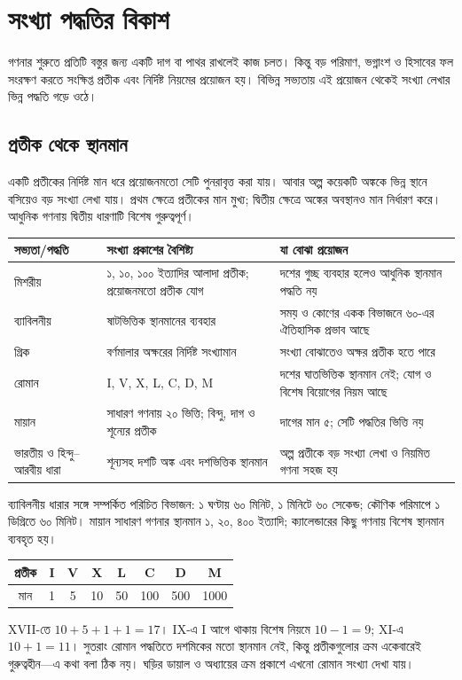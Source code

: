 \section{সংখ্যা পদ্ধতির বিকাশ}
গণনার শুরুতে প্রতিটি বস্তুর জন্য একটি দাগ বা পাথর রাখলেই কাজ চলত। কিন্তু বড় পরিমাণ, ভগ্নাংশ ও হিসাবের ফল সংরক্ষণ করতে সংক্ষিপ্ত প্রতীক এবং নির্দিষ্ট নিয়মের প্রয়োজন হয়। বিভিন্ন সভ্যতায় এই প্রয়োজন থেকেই সংখ্যা লেখার ভিন্ন পদ্ধতি গড়ে ওঠে।

\subsection{প্রতীক থেকে স্থানমান}
একটি প্রতীকের নির্দিষ্ট মান ধরে প্রয়োজনমতো সেটি পুনরাবৃত্ত করা যায়। আবার অল্প কয়েকটি অঙ্ককে ভিন্ন স্থানে বসিয়েও বড় সংখ্যা লেখা যায়। প্রথম ক্ষেত্রে প্রতীকের মান মুখ্য; দ্বিতীয় ক্ষেত্রে অঙ্কের অবস্থানও মান নির্ধারণ করে। আধুনিক গণনায় দ্বিতীয় ধারণাটি বিশেষ গুরুত্বপূর্ণ।
\begin{center}\begin{tabularx}{\linewidth}{|L{.18\linewidth}|Y|Y|}\hline
{}সভ্যতা/পদ্ধতি&সংখ্যা প্রকাশের বৈশিষ্ট্য&যা বোঝা প্রয়োজন\\\hline
মিশরীয়&১, ১০, ১০০ ইত্যাদির আলাদা প্রতীক; প্রয়োজনমতো প্রতীক যোগ&দশের গুচ্ছ ব্যবহার হলেও আধুনিক স্থানমান পদ্ধতি নয়\\\hline
ব্যাবিলনীয়&ষাটভিত্তিক স্থানমানের ব্যবহার&সময় ও কোণের একক বিভাজনে ৬০-এর ঐতিহাসিক প্রভাব আছে\\\hline
গ্রিক&বর্ণমালার অক্ষরের নির্দিষ্ট সংখ্যামান&সংখ্যা বোঝাতেও অক্ষর প্রতীক হতে পারে\\\hline
রোমান&I, V, X, L, C, D, M&দশের ঘাতভিত্তিক স্থানমান নেই; যোগ ও বিশেষ বিয়োগের নিয়ম আছে\\\hline
মায়ান&সাধারণ গণনায় ২০ ভিত্তি; বিন্দু, দাগ ও শূন্যের প্রতীক&দাগের মান ৫; সেটি পদ্ধতির ভিত্তি নয়\\\hline
ভারতীয় ও হিন্দু–আরবীয় ধারা&শূন্যসহ দশটি অঙ্ক এবং দশভিত্তিক স্থানমান&অল্প প্রতীকে বড় সংখ্যা লেখা ও নিয়মিত গণনা সহজ হয়\\\hline
\end{tabularx}\end{center}
ব্যাবিলনীয় ধারার সঙ্গে সম্পর্কিত পরিচিত বিভাজন: ১ ঘণ্টায় ৬০ মিনিট, ১ মিনিটে ৬০ সেকেন্ড; কৌণিক পরিমাপে ১ ডিগ্রিতে ৬০ মিনিট। মায়ান সাধারণ গণনার স্থানমান ১, ২০, ৪০০ ইত্যাদি; ক্যালেন্ডারের কিছু গণনায় বিশেষ স্থানমান ব্যবহৃত হয়।

\begin{center}\begin{tabular}{|c|c|c|c|c|c|c|c|}\hline
প্রতীক&I&V&X&L&C&D&M\\\hline
মান&1&5&10&50&100&500&1000\\\hline
\end{tabular}\end{center}
XVII-তে $10+5+1+1=17$। IX-এ I আগে থাকায় বিশেষ নিয়মে $10-1=9$; XI-এ $10+1=11$। সুতরাং রোমান পদ্ধতিতে দশমিকের মতো স্থানমান নেই, কিন্তু প্রতীকগুলোর ক্রম একেবারেই গুরুত্বহীন—এ কথা বলা ঠিক নয়। ঘড়ির ডায়াল ও অধ্যায়ের ক্রম প্রকাশে এখনো রোমান সংখ্যা দেখা যায়।

